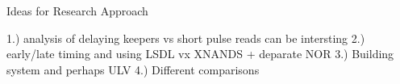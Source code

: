 Ideas for Research Approach

1.) analysis of delaying keepers vs short pulse reads can be intersting
2.) early/late timing and using LSDL vx XNANDS + deparate NOR
3.) Building system and perhaps ULV
4.) Different comparisons


